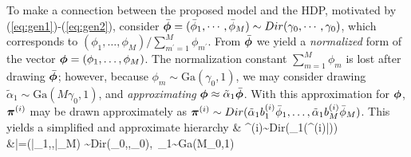 \documentclass[journal]{IEEEtran}
\begin{document}

To make a connection between the proposed model and the HDP, motivated by (\ref{eq:gen1})-(\ref{eq:gen2}), consider $\bar{\boldsymbol{\phi}}=(\bar{\phi}_1,\cdots,\bar{\phi}_M) \sim \relax{Dir}(\gamma_0,\cdots,\gamma_0)$, which corresponds to $(\phi_1,\dots,\phi_M)/\sum_{m^\prime=1}^M \phi_{m^\prime}$. From $\bar{\boldsymbol{\phi}}$ we yield a \emph{normalized} form of the vector $\boldsymbol{\phi}=(\phi_1,\dots,\phi_M)$. The normalization constant $\sum_{m=1}^M\phi_m$ is lost after drawing $\bar{\boldsymbol{\phi}}$; however, because $\phi_m\sim\mbox{Ga}(\gamma_0,1)$, we may consider drawing $\tilde{\alpha}_1\sim\mbox{Ga}(M\gamma_0,1)$, and \emph{approximating} ${\boldsymbol{\phi}}\approx\tilde{\alpha}_1\bar{\boldsymbol{\phi}}$. With this approximation for $\boldsymbol{\phi}$, $\boldsymbol{\pi}^{(i)}$ may be drawn approximately as $\boldsymbol{\pi}^{(i)}\sim\relax{Dir}(\tilde{\alpha}_1b_1^{(i)}\bar{\phi}_1,\dots,\tilde{\alpha}_1b_M^{(i)}\bar{\phi}_M)$. This yields a simplified and approximate hierarchy
\beqs & \piv^{(i)}\sim\mbox{Dir}(\tilde{\alpha}_1(\bv^{(i)}\odot\bar{\phiv}))\\ &\bar{\phiv}=(\bar{\phi}_1,\cdots,\bar{\phi}_M) \sim \mbox{Dir}(\gamma_0,\cdots,\gamma_0),~\tilde{\alpha}_1\sim\mbox{Ga}(M\gamma_0,1)\nonumber\eeqs
\end{document}
